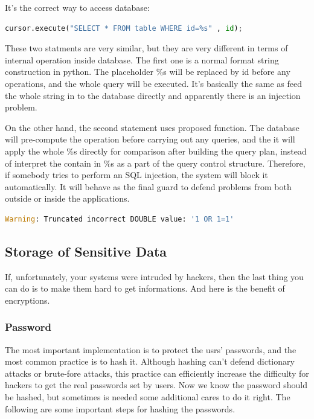 \documentclass[conference]{IEEEtran}
\begin{document}
It's the correct way to access database:
\begin{lstlisting}[language=python]
cursor.execute("SELECT * FROM table WHERE id=%s" , id);
\end{lstlisting}

These two statments are very similar, but they are
very different in terms of internal operation inside database.
The first one is a normal format string construction in python.
The placeholder \%s will be replaced by id before any operations,
and the whole query will be executed.
It's basically the same as feed the whole string in to the database
directly and
apparently there is an injection problem.

On the other hand,
the second statement uses proposed function.
The database will pre-compute the operation before carrying out any queries,
and the it will apply the whole \%s directly for comparison after building
the query plan, instead of interpret the contain in \%s as a part of the
query control structure.
Therefore,
if somebody tries to perform an SQL injection, the system will block it automatically.
It will behave as the final guard to defend problems from both outside or inside
the applications.
\begin{lstlisting}[language=python]
Warning: Truncated incorrect DOUBLE value: '1 OR 1=1'
\end{lstlisting}

\subsection{Storage of Sensitive Data}
If, unfortunately, your systems were intruded by hackers,
then the last thing you can do is to make them hard to get informations.
And here is the benefit of encryptions.

\subsubsection{Password}
The most important implementation is to protect
the usrs' passwords, and the most common practice is to hash it.
Although hashing can't defend dictionary attacks or brute-fore attacks,
this practice can efficiently increase the difficulty for hackers to
get the real passwords set by users.
Now we know the password should be hashed, but sometimes
is needed some additional cares to do it right. The following are
some important steps for hashing the passwords.
\end{document}
